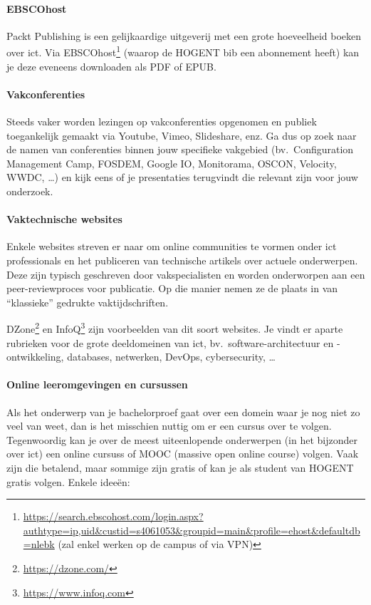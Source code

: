 \paragraph{EBSCOhost}

Packt Publishing is een gelijkaardige uitgeverij met een grote hoeveelheid boeken over ict. Via EBSCOhost\footnote{\url{https://search.ebscohost.com/login.aspx?authtype=ip,uid&custid=s4061053&groupid=main&profile=ehost&defaultdb=nlebk} (zal enkel werken op de campus of via VPN)} (waarop de HOGENT bib een abonnement heeft) kan je deze eveneens downloaden als PDF of EPUB.

\paragraph{Vakconferenties}

Steeds vaker worden lezingen op vakconferenties opgenomen en publiek toegankelijk gemaakt via Youtube, Vimeo, Slideshare, enz. Ga dus op zoek naar de namen van conferenties binnen jouw specifieke vakgebied (bv.\ Configuration Management Camp, FOSDEM, Google IO, Monitorama, OSCON, Velocity, WWDC, \ldots) en kijk eens of je presentaties terugvindt die relevant zijn voor jouw onderzoek.

\paragraph{Vaktechnische websites}

Enkele websites streven er naar om online communities te vormen onder ict professionals en het publiceren van technische artikels over actuele onderwerpen. Deze zijn typisch geschreven door vakspecialisten en worden onderworpen aan een peer-re\-view\-pro\-ces voor publicatie. Op die manier nemen ze de plaats in van ``klassieke'' gedrukte vaktijdschriften.

DZone\footnote{\url{https://dzone.com/}} en InfoQ\footnote{\url{https://www.infoq.com}} zijn voorbeelden van dit soort websites. Je vindt er aparte rubrieken voor de grote deeldomeinen van ict, bv.\ software-architectuur en -ont\-wik\-ke\-ling, databases, netwerken, DevOps, cybersecurity, \ldots

\paragraph{Online leeromgevingen en cursussen}

Als het onderwerp van je bachelorproef gaat over een domein waar je nog niet zo veel van weet, dan is het misschien nuttig om er een cursus over te volgen. Tegenwoordig kan je over de meest uiteenlopende onderwerpen (in het bijzonder over ict) een online cursuss of MOOC (massive open online course) volgen. Vaak zijn die betalend, maar sommige zijn gratis of kan je als student van HOGENT gratis volgen. Enkele ideeën:

